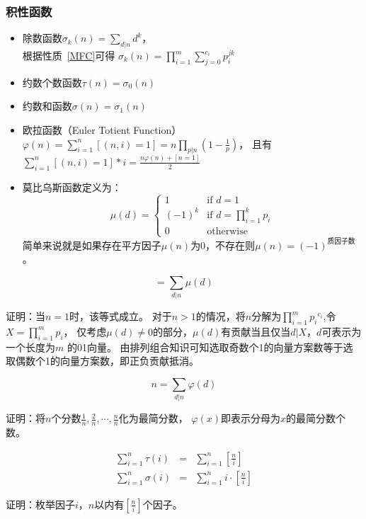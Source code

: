 \subsubsection{积性函数}
\begin{itemize}
	\item 除数函数$\displaystyle \sigma_k(n)=\sum_{d|n}{d^k}$，\\
	      根据性质~\ref{MFC}可得
	      $\displaystyle \sigma_k(n)=\prod_{i=1}^m{\sum_{j=0}^{c_i}{p_i^{jk}}}$
	\item 约数个数函数$\tau(n)=\sigma_0(n)$
	\item 约数和函数$\sigma(n)=\sigma_1(n)$
	\item {}
	      欧拉函数（Euler Totient Function）
	      $\displaystyle \varphi(n)=\sum_{i=1}^n{[(n,i)=1]}=n\prod_{p|n}{(1-\frac{1}{p})}$，
	      且有$\displaystyle \sum_{i=1}^n{[(n,i)=1]*i}=\frac{n\varphi(n)+[n=1]}{2}$
	\item {}
	      莫比乌斯函数定义为：
	      \begin{displaymath}
		      \mu(d)=
		      \left\{
		      \begin{array}{ll}
			      1      & \textrm{if $d=1$}                                \\
			      (-1)^k & \textrm{if $\displaystyle d=\prod_{i=1}^k{p_i}$} \\
			      0      & \textrm{otherwise}
		      \end{array}
		      \right.
	      \end{displaymath}
	      简单来说就是如果存在平方因子$\mu(n)$为0，不存在则$\mu(n)=(-1)^\textrm{质因子数}$。
\end{itemize}
\begin{theorem}\label{MobiusT}
	\begin{displaymath}
		[n=1]=\sum_{d|n}{\mu(d)}
	\end{displaymath}
\end{theorem}
证明：当$n=1$时，该等式成立。
对于$n>1$的情况，将$n$分解为$\displaystyle \prod_{i=1}^m{{p_i}^{c_i}}$,令
$\displaystyle X=\prod_{i=1}^m{p_i}$，
仅考虑$\mu(d)\neq 0$的部分，$\mu(d)$有贡献当且仅当$d|X$，$d$可表示为一个长度为$m$
的01向量。
由排列组合知识可知选取奇数个1的向量方案数等于选取偶数个1的向量方案数，即正负贡献抵消。
\begin{theorem}\label{PhiT}
	\begin{displaymath}
		n=\sum_{d|n}{\varphi(d)}
	\end{displaymath}
\end{theorem}
证明：将$n$个分数$\frac{1}{n},\frac{2}{n},\cdots,\frac{n}{n}$化为最简分数，
$\varphi(x)$即表示分母为$x$的最简分数个数。
\begin{theorem}\label{SigmaT}
	\begin{eqnarray*}
		\sum_{i=1}^n{\tau(i)}&=&\sum_{i=1}^n{[\frac{n}{i}]}\\
		\sum_{i=1}^n{\sigma(i)}&=&\sum_{i=1}^n{i\cdot[\frac{n}{i}]}
	\end{eqnarray*}
\end{theorem}
证明：枚举因子$i$，$n$以内有$[\frac{n}{i}]$个因子。
